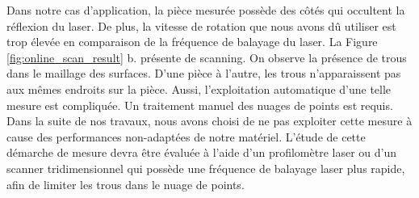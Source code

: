 Dans notre cas d'application, la pièce mesurée possède des côtés qui occultent la réflexion du laser.
De plus, la vitesse de rotation que nous avons dû utiliser est trop élevée en comparaison de la fréquence de balayage du laser.
La Figure \ref{fig:online_scan_result} b. présente de scanning.
On observe la présence de trous dans le maillage des surfaces.
D'une pièce à l'autre, les trous n'apparaissent pas aux mêmes endroits sur la pièce.
Aussi, l'exploitation automatique d'une telle mesure est compliquée.
Un traitement manuel des nuages de points est requis.
Dans la suite de nos travaux, nous avons choisi de ne pas exploiter cette mesure à cause des performances non-adaptées de notre matériel.
L'étude de cette démarche de mesure devra être évaluée à l'aide d'un profilomètre laser ou d'un scanner tridimensionnel qui possède une fréquence de balayage laser plus rapide, afin de limiter les trous dans le nuage de points.


